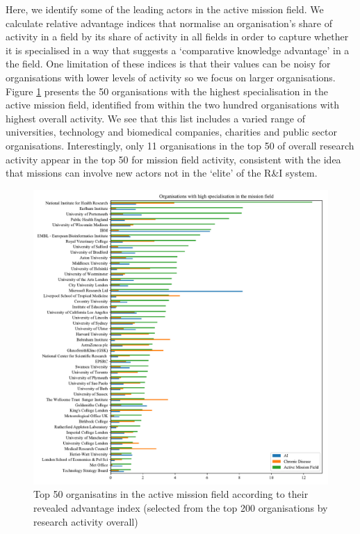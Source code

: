 \documentclass[11pt]{article}
\begin{document}
Here, we identify some of the leading actors in the active mission field. We calculate relative advantage indices that normalise an organisation’s share of activity in a field by its share of activity in all fields in order to capture whether it is specialised in a way that suggests a `comparative knowledge advantage' in a the field. One limitation of these indices is that their values can be noisy for organisations with lower levels of activity so we focus on larger organisations. Figure \ref{fig:top_orgs} presents the 50 organisations with the highest specialisation in the active mission field, identified from within the two hundred organisations with highest overall activity. We see that this list includes a varied range of universities, technology and biomedical companies, charities and public sector organisations. Interestingly, only 11 organisations in the top 50 of overall research activity appear in the top 50 for mission field activity, consistent with the idea that missions can involve new actors not in the `elite' of the R\&I system.

\begin{figure}[!ht]
    \centering
    \includegraphics[width=\textwidth]{figures/fig_15_top_orgs.pdf}
    \caption{Top 50 organisatins in the active mission field according to their revealed advantage index (selected from the top 200 organisations by research activity overall)}
    \label{fig:top_orgs}
\end{figure}
\end{document}
